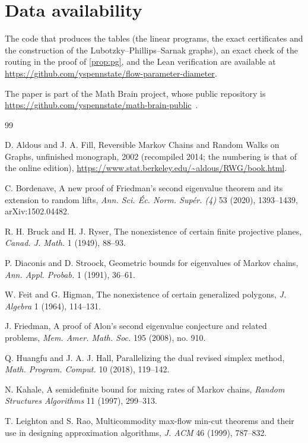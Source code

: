 \documentclass[11pt]{amsart}
\theoremstyle{definition}
\begin{document}
\section*{Data availability}
The code that produces the tables (the linear programs, the exact certificates and the construction of the Lubotzky--Phillips--Sarnak graphs), an exact check of the routing in the proof of \cref{prop:pg}, and the Lean verification are available at \url{https://github.com/yspennstate/flow-parameter-diameter}.

The paper is part of the Math Brain project, whose public repository is \url{https://github.com/yspennstate/math-brain-public}~\cite{MathBrainRepo}.

\begin{thebibliography}{99}

 D. Aldous and J. A. Fill, Reversible Markov Chains and Random Walks on Graphs, unfinished monograph, 2002 (recompiled 2014; the numbering is that of the online edition), \url{https://www.stat.berkeley.edu/~aldous/RWG/book.html}.

 C. Bordenave, A new proof of Friedman's second eigenvalue theorem and its extension to random lifts, \emph{Ann. Sci. \'Ec. Norm. Sup\'er. (4)} 53 (2020), 1393--1439, arXiv:1502.04482.

 R. H. Bruck and H. J. Ryser, The nonexistence of certain finite projective planes, \emph{Canad. J. Math.} 1 (1949), 88--93.

 P. Diaconis and D. Stroock, Geometric bounds for eigenvalues of Markov chains, \emph{Ann. Appl. Probab.} 1 (1991), 36--61.

 W. Feit and G. Higman, The nonexistence of certain generalized polygons, \emph{J. Algebra} 1 (1964), 114--131.

 J. Friedman, A proof of Alon's second eigenvalue conjecture and related problems, \emph{Mem. Amer. Math. Soc.} 195 (2008), no. 910.

 Q. Huangfu and J. A. J. Hall, Parallelizing the dual revised simplex method, \emph{Math. Program. Comput.} 10 (2018), 119--142.

 N. Kahale, A semidefinite bound for mixing rates of Markov chains, \emph{Random Structures Algorithms} 11 (1997), 299--313.

 T. Leighton and S. Rao, Multicommodity max-flow min-cut theorems and their use in designing approximation algorithms, \emph{J. ACM} 46 (1999), 787--832.


\end{thebibliography}
\end{document}
